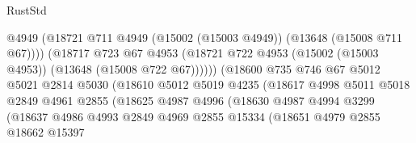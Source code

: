 \begin{lexlean}{RustStd}
\begin{coremodule}
                                        @4949
                                        (@18721
                                          @711
                                          @4949
                                          (@15002 (@15003 @4949))
                                          (@13648 (@15008 @711 @67))))
                                      (@18717
                                        @723
                                        @67
                                        @4953
                                        (@18721
                                          @722
                                          @4953
                                          (@15002 (@15003 @4953))
                                          (@13648 (@15008 @722 @67))))))
                                  (@18600
                                    @735
                                    @746
                                    @67
                                    @5012
                                    @5021
                                    @2814
                                    @5030
                                    (@18610
                                      @5012
                                      @5019
                                      @4235
                                      (@18617
                                        @4998
                                        @5011
                                        @5018
                                        @2849
                                        @4961
                                        @2855
                                        (@18625
                                          @4987
                                          @4996
                                          (@18630
                                            @4987
                                            @4994
                                            @3299
                                            (@18637
                                              @4986
                                              @4993
                                              @2849
                                              @4969
                                              @2855
                                              @15334
                                              (@18651
                                                @4979
                                                @2855
                                                @18662
                                                @15397

\end{coremodule}
\end{lexlean}
